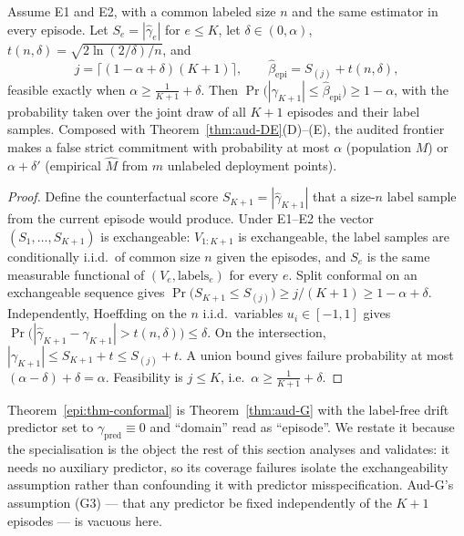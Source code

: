 \begin{theorem}\label{epi:thm-conformal}
Assume E1 and E2, with a common labeled size $n$ and the same estimator in every episode. Let
$S_e=|\widehat\gamma_e|$ for $e\le K$, let $\delta\in(0,\alpha)$,
$t(n,\delta)=\sqrt{2\ln(2/\delta)/n}$, and
\[
j=\bigl\lceil(1-\alpha+\delta)(K+1)\bigr\rceil,
\qquad
\widehat\beta_{\mathrm{epi}}=S_{(j)}+t(n,\delta),
\]
feasible exactly when $\alpha\ge\tfrac1{K+1}+\delta$. Then
$\Pr\bigl(|\gamma_{K+1}|\le\widehat\beta_{\mathrm{epi}}\bigr)\ge1-\alpha$, with the probability
taken over the joint draw of all $K+1$ episodes and their label samples. Composed with
Theorem~\ref{thm:aud-DE}(D)--(E), the audited frontier makes a false strict commitment with
probability at most $\alpha$ (population $M$) or $\alpha+\delta'$ (empirical $\widehat M$ from $m$
unlabeled deployment points).
\end{theorem}

\begin{proof}
Define the counterfactual score $S_{K+1}=|\widehat\gamma_{K+1}|$ that a size-$n$ label sample from
the current episode would produce. Under E1--E2 the vector $(S_1,\dots,S_{K+1})$ is exchangeable:
$V_{1:K+1}$ is exchangeable, the label samples are conditionally i.i.d.\ of common size $n$ given the
episodes, and $S_e$ is the same measurable functional of $(V_e,\text{labels}_e)$ for every $e$. Split
conformal on an exchangeable sequence gives
$\Pr\bigl(S_{K+1}\le S_{(j)}\bigr)\ge j/(K+1)\ge1-\alpha+\delta$. Independently, Hoeffding on the
$n$ i.i.d.\ variables $u_i\in[-1,1]$ gives
$\Pr\bigl(|\widehat\gamma_{K+1}-\gamma_{K+1}|>t(n,\delta)\bigr)\le\delta$. On the intersection,
$|\gamma_{K+1}|\le S_{K+1}+t\le S_{(j)}+t$. A union bound gives failure probability at most
$(\alpha-\delta)+\delta=\alpha$. Feasibility is $j\le K$, i.e.\ $\alpha\ge\tfrac1{K+1}+\delta$.
\end{proof}

\begin{remark}\label{epi:rem-audG}
Theorem~\ref{epi:thm-conformal} is Theorem~\ref{thm:aud-G} with the label-free drift predictor set
to $\gamma_{\mathrm{pred}}\equiv0$ and ``domain'' read as ``episode''. We restate it because the
specialisation is the object the rest of this section analyses and validates: it needs no auxiliary
predictor, so its coverage failures isolate the exchangeability assumption rather than confounding it
with predictor misspecification. Aud-G's assumption (G3) --- that any predictor be fixed
independently of the $K{+}1$ episodes --- is vacuous here.
\end{remark}

